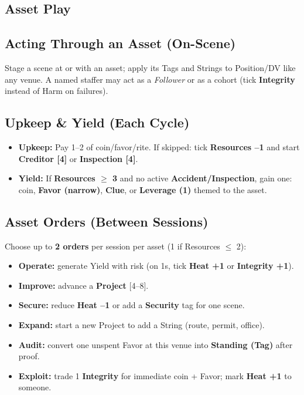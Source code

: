 \documentclass[10pt]{article}
\begin{document}
\begin{center}
    \section{Asset Play}
    \subsection{Acting Through an Asset (On-Scene)}
    Stage a scene at or with an asset; apply its Tags and Strings to Position/DV like any venue. A named staffer may act as a \emph{Follower} or as a cohort (tick \textbf{Integrity} instead of Harm on failures).
    
    \subsection{Upkeep \& Yield (Each Cycle)}
    \begin{itemize}
      \item \textbf{Upkeep:} Pay 1--2 of coin/favor/rite. If skipped: tick \textbf{Resources --1} and start \textbf{Creditor [4]} or \textbf{Inspection [4]}.
      \item \textbf{Yield:} If \textbf{Resources $\geq$ 3} and no active \textbf{Accident/Inspection}, gain one: coin, \textbf{Favor (narrow)}, \textbf{Clue}, or \textbf{Leverage (1)} themed to the asset.
    \end{itemize}
    
    \subsection{Asset Orders (Between Sessions)}
    Choose up to \textbf{2 orders} per session per asset (1 if Resources $\leq$ 2):
    \begin{itemize}
      \item \textbf{Operate:} generate Yield with risk (on 1s, tick \textbf{Heat +1} or \textbf{Integrity +1}).
      \item \textbf{Improve:} advance a \textbf{Project} [4--8].
      \item \textbf{Secure:} reduce \textbf{Heat --1} or add a \textbf{Security} tag for one scene.
      \item \textbf{Expand:} start a new Project to add a String (route, permit, office).
      \item \textbf{Audit:} convert one unspent Favor at this venue into \textbf{Standing (Tag)} after proof.
      \item \textbf{Exploit:} trade 1 \textbf{Integrity} for immediate coin + Favor; mark \textbf{Heat +1} to someone.
    \end{itemize}

\end{center}
\end{document}
